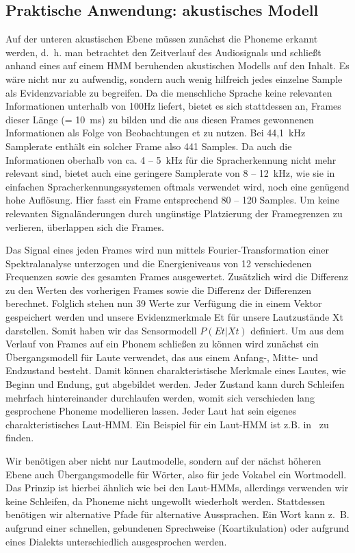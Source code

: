 \subsection{Praktische Anwendung: akustisches Modell}
Auf der unteren akustischen Ebene müssen zunächst die Phoneme erkannt werden, d.~h.
man betrachtet den Zeitverlauf des Audiosignals und schließt anhand eines auf einem HMM beruhenden akustischen Modells auf den Inhalt.
Es wäre nicht nur zu aufwendig, sondern auch wenig hilfreich jedes einzelne Sample als Evidenzvariable zu begreifen.
Da die menschliche Sprache keine relevanten Informationen unterhalb von 100Hz liefert, bietet es sich stattdessen an, Frames dieser Länge (= 10~ms) zu bilden und die aus diesen Frames gewonnenen Informationen als Folge von Beobachtungen et zu nutzen.
Bei 44,1~kHz Samplerate enthält ein solcher Frame also 441 Samples.
Da auch die Informationen oberhalb von ca.
4 – 5~kHz für die Spracherkennung nicht mehr relevant sind, bietet auch eine geringere Samplerate von 8 – 12~kHz, wie sie in einfachen Spracherkennungssystemen oftmals verwendet wird, noch eine genügend hohe Auflösung.
Hier fasst ein Frame entsprechend 80 – 120 Samples.
Um keine relevanten Signaländerungen durch ungünstige Platzierung der Framegrenzen zu verlieren, überlappen sich die Frames.

Das Signal eines jeden Frames wird nun mittels Fourier-Transformation einer Spektralanalyse unterzogen und die Energieniveaus von 12 verschiedenen Frequenzen sowie des gesamten Frames ausgewertet.
Zusätzlich wird die Differenz zu den Werten des vorherigen Frames sowie die Differenz der Differenzen berechnet.
Folglich stehen nun 39 Werte zur Verfügung die in einem Vektor gespeichert werden und unsere Evidenzmerkmale Et für unsere Lautzustände Xt darstellen.
Somit haben wir das Sensormodell $P( Et | Xt )$ definiert.
Um aus dem Verlauf von Frames auf ein Phonem schließen zu können wird zunächst ein Übergangsmodell für Laute verwendet, das aus einem Anfang-, Mitte- und Endzustand besteht.
Damit können charakteristische Merkmale eines Lautes, wie Beginn und Endung, gut abgebildet werden.
Jeder Zustand kann durch Schleifen mehrfach hintereinander durchlaufen werden, womit sich verschieden lang gesprochene Phoneme modellieren lassen.
Jeder Laut hat sein eigenes charakteristisches Laut-HMM.
Ein Beispiel für ein Laut-HMM ist z.B. in~\cite[S. 1058]{russelnorvig} zu finden.

Wir benötigen aber nicht nur Lautmodelle, sondern auf der nächst höheren Ebene auch Übergangsmodelle für Wörter, also für jede Vokabel ein Wortmodell.
Das Prinzip ist hierbei ähnlich wie bei den Laut-HMMs, allerdings verwenden wir keine Schleifen, da Phoneme nicht ungewollt wiederholt werden.
Stattdessen benötigen wir alternative Pfade für alternative Aussprachen.
Ein Wort kann z.~B.
aufgrund einer schnellen, gebundenen Sprechweise (Koartikulation) oder aufgrund eines Dialekts unterschiedlich ausgesprochen werden.


